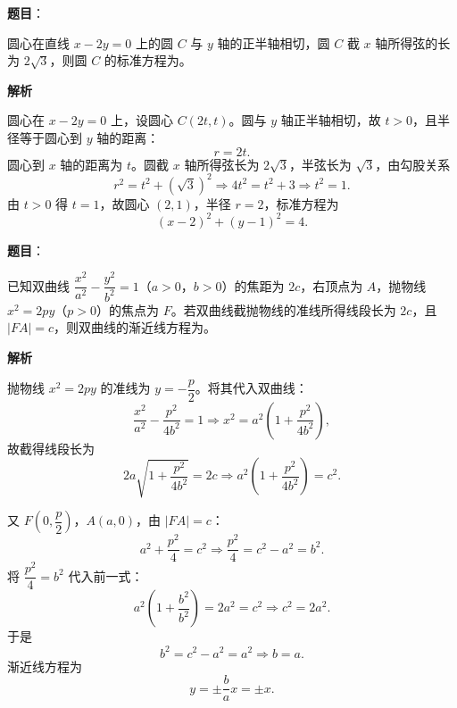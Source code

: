 \begin{answer}

\textbf{题目}：

圆心在直线 $x-2y=0$ 上的圆 $C$ 与 $y$ 轴的正半轴相切，圆 $C$ 截 $x$ 轴所得弦的长为 $2\sqrt3$，则圆 $C$ 的标准方程为\gkblank{}。

\textbf{解析}

圆心在 $x-2y=0$ 上，设圆心 $C(2t,t)$。圆与 $y$ 轴正半轴相切，故 $t>0$，且半径等于圆心到 $y$ 轴的距离：
\nopagebreak[4]
\[r=2t .\]
圆心到 $x$ 轴的距离为 $t$。圆截 $x$ 轴所得弦长为 $2\sqrt3$，半弦长为 $\sqrt3$，由勾股关系
\nopagebreak[4]
\[r^2=t^2+(\sqrt3)^2\Longrightarrow4t^2=t^2+3\Longrightarrow t^2=1 .\]
由 $t>0$ 得 $t=1$，故圆心 $(2,1)$，半径 $r=2$，标准方程为
\nopagebreak[4]
\[(x-2)^2+(y-1)^2=4 .\]


\end{answer}
\begin{answer}

\textbf{题目}：

已知双曲线 $\dfrac{x^2}{a^2}-\dfrac{y^2}{b^2}=1$（$a>0$，$b>0$）的焦距为 $2c$，右顶点为 $A$，抛物线 $x^2=2py$（$p>0$）的焦点为 $F$。若双曲线截抛物线的准线所得线段长为 $2c$，且 $|FA|=c$，则双曲线的渐近线方程为\gkblank{}。

\textbf{解析}

抛物线 $x^2=2py$ 的准线为 $y=-\dfrac p2$。将其代入双曲线：
\nopagebreak[4]
\[\frac{x^2}{a^2}-\frac{p^2}{4b^2}=1
\Longrightarrow x^2=a^2\left(1+\frac{p^2}{4b^2}\right),\]
故截得线段长为
\nopagebreak[4]
\[2a\sqrt{1+\frac{p^2}{4b^2}}=2c
\Longrightarrow a^2\left(1+\frac{p^2}{4b^2}\right)=c^2.\]

又 $F\left(0,\dfrac p2\right)$，$A(a,0)$，由 $|FA|=c$：
\nopagebreak[4]
\[a^2+\frac{p^2}4=c^2
\Longrightarrow\frac{p^2}4=c^2-a^2=b^2 .\]
将 $\dfrac{p^2}4=b^2$ 代入前一式：
\nopagebreak[4]
\[a^2\left(1+\frac{b^2}{b^2}\right)=2a^2=c^2
\Longrightarrow c^2=2a^2 .\]
于是
\nopagebreak[4]
\[b^2=c^2-a^2=a^2\Longrightarrow b=a .\]
渐近线方程为
\nopagebreak[4]
\[y=\pm\frac bax=\pm x .\]


\end{answer}

